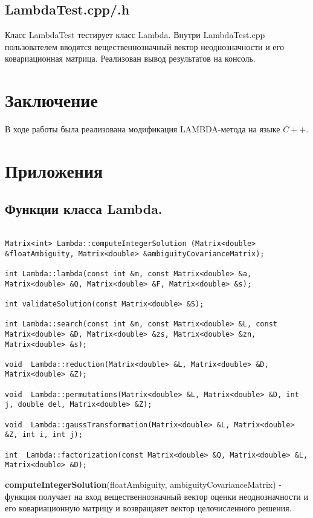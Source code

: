 \documentclass[12pt]{matmex-diploma}
\begin{document}
\subsection{LambdaTest.cpp/.h}
Класс LambdaTest тестирует класс Lambda. Внутри LambdaTest.cpp пользователем 
вводятся вещественнозначный вектор неоднозначности и его ковариационная матрица. 
Реализован вывод результатов на консоль.

\section*{Заключение}
В ходе работы была реализована модификация LAMBDA-метода на языке $C++$. 

\newpage
\section*{Приложения}
\subsection*{Функции класса Lambda.}

\begin{lstlisting}[label=some-code,caption=lambda.h]

Matrix<int> Lambda::computeIntegerSolution (Matrix<double>  &floatAmbiguity, Matrix<double> &ambiguityCovarianceMatrix);

int Lambda::lambda(const int &m, const Matrix<double> &a, Matrix<double> &Q, Matrix<double> &F, Matrix<double> &s);

int validateSolution(const Matrix<double> &S);

int Lambda::search(const int &m, const Matrix<double> &L, const Matrix<double> &D, Matrix<double> &zs, Matrix<double> &zn, Matrix<double> &s);

void  Lambda::reduction(Matrix<double> &L, Matrix<double> &D, Matrix<double> &Z);

void  Lambda::permutations(Matrix<double> &L, Matrix<double> &D, int j, double del, Matrix<double> &Z);

void  Lambda::gaussTransformation(Matrix<double> &L, Matrix<double> &Z, int i, int j); 

int  Lambda::factorization(const Matrix<double> &Q, Matrix<double> &L, Matrix<double> &D);

\end{lstlisting}

\textbf{computeIntegerSolution}(floatAmbiguity, ambiguityCovarianceMatrix) - функция получает
на вход вещественнозначный вектор оценки неоднозначности и его ковариационную
матрицу и возвращаяет вектор целочисленного решения.\\ 
\end{document}
